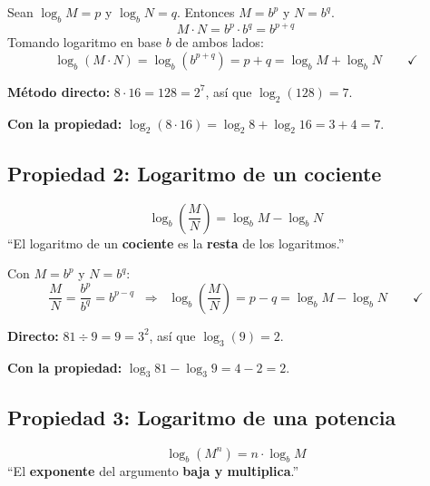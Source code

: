 \documentclass[11pt,a4paper]{article}
\begin{document}
\begin{tcolorbox}[definicion, title={¿De dónde sale?}]
Sean $\log_b M = p$ y $\log_b N = q$. Entonces $M = b^{p}$ y $N = b^{q}$.
\[
  M \cdot N = b^{p} \cdot b^{q} = b^{p+q}
\]
Tomando logaritmo en base $b$ de ambos lados:
\[
  \log_b(M \cdot N) = \log_b(b^{p+q}) = p + q = \log_b M + \log_b N \qquad \checkmark
\]
\end{tcolorbox}

\begin{tcolorbox}[ejemplo, title={Ejemplo: $\log_2(8 \cdot 16)$}]
\textbf{Método directo:} $8 \cdot 16 = 128 = 2^{7}$, así que $\log_2(128) = 7$.

\textbf{Con la propiedad:} $\log_2(8 \cdot 16) = \log_2 8 + \log_2 16 = 3 + 4 = 7$. \checkmark
\end{tcolorbox}

\subsection{Propiedad 2: Logaritmo de un cociente}

\begin{tcolorbox}[propiedad, title={Propiedad del cociente}]
\[
  \boxed{\;\log_b\!\left(\frac{M}{N}\right) = \log_b M - \log_b N\;}
\]
``El logaritmo de un \textbf{cociente} es la \textbf{resta} de los logaritmos.''
\end{tcolorbox}

\begin{tcolorbox}[definicion, title={¿De dónde sale?}]
Con $M = b^{p}$ y $N = b^{q}$:
\[
  \frac{M}{N} = \frac{b^{p}}{b^{q}} = b^{p-q} \;\;\Longrightarrow\;\; \log_b\!\left(\frac{M}{N}\right) = p - q = \log_b M - \log_b N \qquad \checkmark
\]
\end{tcolorbox}

\begin{tcolorbox}[ejemplo, title={Ejemplo: $\log_3\!\left(\frac{81}{9}\right)$}]
\textbf{Directo:} $81 \div 9 = 9 = 3^{2}$, así que $\log_3(9) = 2$.

\textbf{Con la propiedad:} $\log_3 81 - \log_3 9 = 4 - 2 = 2$. \checkmark
\end{tcolorbox}

\subsection{Propiedad 3: Logaritmo de una potencia}

\begin{tcolorbox}[propiedad, title={Propiedad de la potencia}]
\[
  \boxed{\;\log_b(M^{n}) = n \cdot \log_b M\;}
\]
``El \textbf{exponente} del argumento \textbf{baja y multiplica}.''
\end{tcolorbox}
\end{document}
